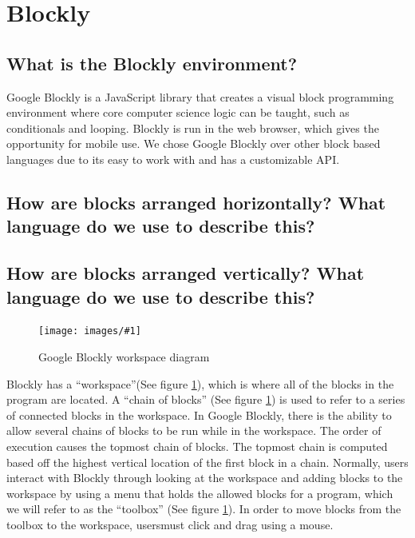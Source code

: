 \documentclass[]{article}
\newcommand\fig[3]{
\begin{figure}
  \begin{center}
  \texttt{[image: images/\#1]}
  \caption{#2} 
  \label{fig:#1}
  \end{center}
\end{figure}
}
\begin{document}
\section{Blockly}

\subsection{What is the Blockly environment?}
Google Blockly is a JavaScript library that creates a visual block programming 
environment where core computer science logic can be taught, such as conditionals and 
looping. Blockly is run in the web browser, which gives the opportunity for mobile use. 
We chose Google Blockly over other block based languages due to its easy to work with and 
has a customizable API.

\subsection{How are blocks arranged horizontally? What language do we use to describe this?}

\subsection{How are blocks arranged vertically? What language do we use to describe this?}

\fig{workspaceDiagram.jpg}{Google Blockly workspace diagram}{width=7cm}

Blockly has a ``workspace''(See figure \ref{fig:workspaceDiagram.jpg}), which is where all of the blocks in the program are located. A ``chain of blocks''
(See figure \ref{fig:workspaceDiagram.jpg}) is used to refer to a series of connected blocks in the workspace. In Google Blockly,  
there is the ability to allow several chains of blocks to be run while
in the workspace. The order of execution causes the topmost chain of blocks. The topmost chain
is computed based off the highest vertical location of the first block in a chain. Normally, users interact
with Blockly through looking at the workspace and adding blocks to the workspace by
using a menu that holds the allowed blocks for a program, which we will refer to as the 
``toolbox'' (See figure \ref{fig:workspaceDiagram.jpg}). In order to move blocks from the toolbox to the 
workspace, usersmust click and drag using a mouse. \\
\end{document}
